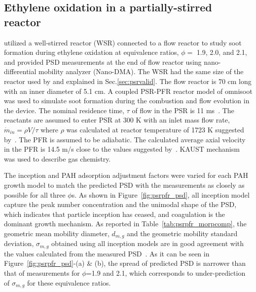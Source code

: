 \subsection{Ethylene oxidation in a partially-stirred reactor}

\citet{manzello2007soot} utilized a well-stirred reactor (WSR) connected to a flow reactor to study soot formation during ethylene oxidation at equivalence ratios, $\phi=$ 1.9, 2.0, and 2.1, and provided PSD measurements at the end of flow reactor using nano-differential mobility analyzer (Nano-DMA). The WSR had the same size of the reactor used by \citet{manzello2007soot} and explained in Sec.\ref{sec:psrvalid}. The flow reactor is 70 cm long with an inner diameter of 5.1 cm. A coupled PSR-PFR reactor model of omnisoot was used to simulate soot formation during the combustion and flow evolution in the device. The nominal residence time, $\tau$ of flow in the PSR is 11 ms~\citep{manzello2007soot}. The reactants are assumed to enter PSR at 300 K with an inlet mass flow rate, $\dot{m}_{in}=\rho V / \tau$ where $\rho$ was calculated at reactor temperature of 1723 K suggested by~\citet{lenhert2009effects}. The PFR is assumed to be adiabatic. The calculated average axial velocity in the PFR is 14.5 m/s close to the values suggested by~\citet{manzello2007soot}. KAUST mechanism was used to describe gas chemistry. 

The inception and PAH adsorption adjustment factors were varied for each PAH growth model to match the predicted PSD with the measurements as closely as possible for all three $\phi$s. As shown in Figure~\ref{fig:psrpfr_psd}, all inception model capture the peak number concentration and the unimodal shape of the PSD, which indicates that particle inception has ceased, and coagulation is the dominant growth mechanism. As reported in Table~\ref{tab:psrpfr_morpcomp}, the geometric mean mobility diameter, $d_{m,g}$ and the geometric mobility standard deviation, $\sigma_{m,g}$ obtained using all inception models are in good agreement with the values calculated from the measured PSD~\citep{manzello2007soot}. As it can be seen in Figure~\ref{fig:psrpfr_psd}-(a) \& (b), the spread of predicted PSD is narrower than that of measurements for $\phi$=1.9 and 2.1, which corresponds to under-prediction of $\sigma_{m,g}$ for these equivalence ratios.


